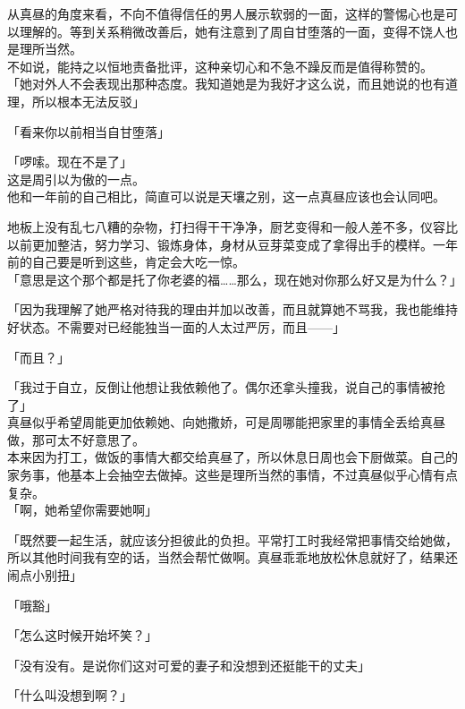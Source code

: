 从真昼的角度来看，不向不值得信任的男人展示软弱的一面，这样的警惕心也是可以理解的。等到关系稍微改善后，她有注意到了周自甘堕落的一面，变得不饶人也是理所当然。\\

不如说，能持之以恒地责备批评，这种亲切心和不急不躁反而是值得称赞的。\\

「她对外人不会表现出那种态度。我知道她是为我好才这么说，而且她说的也有道理，所以根本无法反驳」

「看来你以前相当自甘堕落」

「啰嗦。现在不是了」\\

这是周引以为傲的一点。\\

他和一年前的自己相比，简直可以说是天壤之别，这一点真昼应该也会认同吧。

地板上没有乱七八糟的杂物，打扫得干干净净，厨艺变得和一般人差不多，仪容比以前更加整洁，努力学习、锻炼身体，身材从豆芽菜变成了拿得出手的模样。一年前的自己要是听到这些，肯定会大吃一惊。\\

「意思是这个那个都是托了你老婆的福……那么，现在她对你那么好又是为什么？」

「因为我理解了她严格对待我的理由并加以改善，而且就算她不骂我，我也能维持好状态。不需要对已经能独当一面的人太过严厉，而且——」

「而且？」

「我过于自立，反倒让他想让我依赖他了。偶尔还拿头撞我，说自己的事情被抢了」\\

真昼似乎希望周能更加依赖她、向她撒娇，可是周哪能把家里的事情全丢给真昼做，那可太不好意思了。\\

本来因为打工，做饭的事情大都交给真昼了，所以休息日周也会下厨做菜。自己的家务事，他基本上会抽空去做掉。这些是理所当然的事情，不过真昼似乎心情有点复杂。\\

「啊，她希望你需要她啊」

「既然要一起生活，就应该分担彼此的负担。平常打工时我经常把事情交给她做，所以其他时间我有空的话，当然会帮忙做啊。真昼乖乖地放松休息就好了，结果还闹点小别扭」

「哦豁」

「怎么这时候开始坏笑？」

「没有没有。是说你们这对可爱的妻子和没想到还挺能干的丈夫」

「什么叫没想到啊？」

